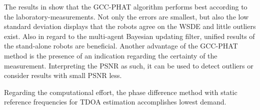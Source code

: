 The results in  show
that the \ac{GCC-PHAT} algorithm performs best according to the
laboratory-measurements.
Not only the errors are smallest, but also the low standard deviation
displays that the robots agree on the \ac{WSDE} and little outliers exist.
Also in regard to the multi-agent Bayesian updating filter, unified
results of the stand-alone robots are beneficial.
Another advantage of the \ac{GCC-PHAT} method is the presence of
an indication regarding the certainty of the measurement.
Interpreting the \ac{PSNR} as such, it can be used to detect outliers
or consider results with small \ac{PSNR} less.

Regarding the computational effort, the phase difference method
with static reference frequencies for \ac{TDOA} estimation
accomplishes lowest demand.